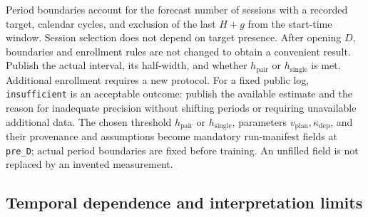 \documentclass[12pt,a4paper]{article}
\newcommand{\code}[1]{{\ttfamily\small\nolinkurl{#1}}}
\theoremstyle{plainru}
\begin{document}
Period boundaries account for the forecast number of sessions with a recorded target,
calendar cycles, and exclusion of the last $H+g$ from the start-time window.
Session selection does not depend on target presence. After opening $D$,
boundaries and enrollment rules are not changed to obtain a convenient result.
Publish the actual interval, its half-width, and whether
$h_{\mathrm{pair}}$ or $h_{\mathrm{single}}$ is met.
Additional enrollment requires a new protocol.
For a fixed public log, \texttt{insufficient}
is an acceptable outcome: publish the available estimate and the reason for inadequate
precision without shifting periods or requiring unavailable additional data.
The chosen threshold $h_{\mathrm{pair}}$ or $h_{\mathrm{single}}$,
parameters $v_{\mathrm{plan}},\kappa_{\mathrm{dep}}$,
and their provenance and assumptions become mandatory run-manifest fields
at \code{pre_D}; actual period boundaries are fixed before training.
An unfilled field is not replaced by an invented measurement.

\subsection{Temporal dependence and interpretation limits}
\label{sec:eval-time-block}
\end{document}
